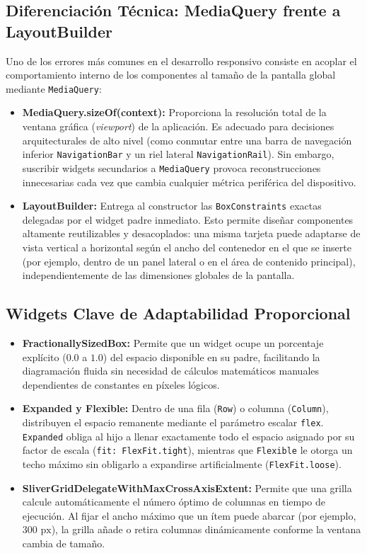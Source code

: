 \documentclass[12pt,a4paper]{article}
\begin{document}
\subsection{Diferenciación Técnica: MediaQuery frente a LayoutBuilder}
Uno de los errores más comunes en el desarrollo responsivo consiste en acoplar el comportamiento interno de los componentes al tamaño de la pantalla global mediante \texttt{MediaQuery}:
\begin{itemize}[leftmargin=*]
    \item \textbf{MediaQuery.sizeOf(context):} Proporciona la resolución total de la ventana gráfica (\textit{viewport}) de la aplicación. Es adecuado para decisiones arquitecturales de alto nivel (como conmutar entre una barra de navegación inferior \texttt{NavigationBar} y un riel lateral \texttt{NavigationRail}). Sin embargo, suscribir widgets secundarios a \texttt{MediaQuery} provoca reconstrucciones innecesarias cada vez que cambia cualquier métrica periférica del dispositivo.
    \item \textbf{LayoutBuilder:} Entrega al constructor las \texttt{BoxConstraints} exactas delegadas por el widget padre inmediato. Esto permite diseñar componentes altamente reutilizables y desacoplados: una misma tarjeta puede adaptarse de vista vertical a horizontal según el ancho del contenedor en el que se inserte (por ejemplo, dentro de un panel lateral o en el área de contenido principal), independientemente de las dimensiones globales de la pantalla.
\end{itemize}

\subsection{Widgets Clave de Adaptabilidad Proporcional}
\begin{itemize}[leftmargin=*]
    \item \textbf{FractionallySizedBox:} Permite que un widget ocupe un porcentaje explícito ($0.0$ a $1.0$) del espacio disponible en su padre, facilitando la diagramación fluida sin necesidad de cálculos matemáticos manuales dependientes de constantes en píxeles lógicos.
    \item \textbf{Expanded y Flexible:} Dentro de una fila (\texttt{Row}) o columna (\texttt{Column}), distribuyen el espacio remanente mediante el parámetro escalar \texttt{flex}. \texttt{Expanded} obliga al hijo a llenar exactamente todo el espacio asignado por su factor de escala (\texttt{fit: FlexFit.tight}), mientras que \texttt{Flexible} le otorga un techo máximo sin obligarlo a expandirse artificialmente (\texttt{FlexFit.loose}).
    \item \textbf{SliverGridDelegateWithMaxCrossAxisExtent:} Permite que una grilla calcule automáticamente el número óptimo de columnas en tiempo de ejecución. Al fijar el ancho máximo que un ítem puede abarcar (por ejemplo, $300\text{ px}$), la grilla añade o retira columnas dinámicamente conforme la ventana cambia de tamaño.
\end{itemize}
\end{document}
